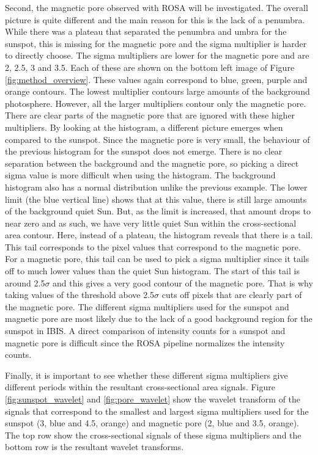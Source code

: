     Second, the magnetic pore observed with ROSA will be investigated.
    The overall picture is quite different and the main reason for this is the lack of a penumbra.
    While there was a plateau that separated the penumbra and umbra for the sunspot, this is missing for the magnetic pore and the sigma multiplier is harder to directly choose.
    The sigma multipliers are lower for the magnetic pore and are 2, 2.5, 3 and 3.5.
    Each of these are shown on the bottom left image of Figure \ref{fig:method_overview}.
    These values again correspond to blue, green, purple and orange contours.
    The lowest multiplier contours large amounts of the background photosphere.
    However, all the larger multipliers contour only the magnetic pore.
    There are clear parts of the magnetic pore that are ignored with these higher multipliers.
    By looking at the histogram, a different picture emerges when compared to the sunspot.
    Since the magnetic pore is very small, the behaviour of the previous histogram for the sunspot does not emerge.
    There is no clear separation between the background and the magnetic pore, so picking a direct sigma value is more difficult when using the histogram.
    The background histogram also has a normal distribution unlike the previous example.
    The lower limit (the blue vertical line) shows that at this value, there is still large amounts of the background quiet Sun.
    But, as the limit is increased, that amount drops to near zero and as such, we have very little quiet Sun within the cross-sectional area contour.
    Here, instead of a plateau, the histogram reveals that there is a tail.
    This tail corresponds to the pixel values that correspond to the magnetic pore.
    For a magnetic pore, this tail can be used to pick a sigma multiplier since it tails off to much lower values than the quiet Sun histogram.
    The start of this tail is around 2.5$\sigma$ and this gives a very good contour of the magnetic pore.
    That is why taking values of the threshold above 2.5$\sigma$ cuts off pixels that are clearly part of the magnetic pore.
    The different sigma multipliers used for the sunspot and magnetic pore are most likely due to the lack of a good background region for the sunspot in IBIS.
    A direct comparison of intensity counts for a sunspot and magnetic pore is difficult since the ROSA pipeline normalizes the intensity counts.
    
    Finally, it is important to see whether these different sigma multipliers give different periods within the resultant cross-sectional area signals.
    Figure \ref{fig:sunspot_wavelet} and \ref{fig:pore_wavelet} show the wavelet transform of the signals that correspond to the smallest and largest sigma multipliers used for the sunspot (3, blue and 4.5, orange) and magnetic pore (2, blue and 3.5, orange).
    The top row show the cross-sectional signals of these sigma multipliers and the bottom row is the resultant wavelet transforms.

